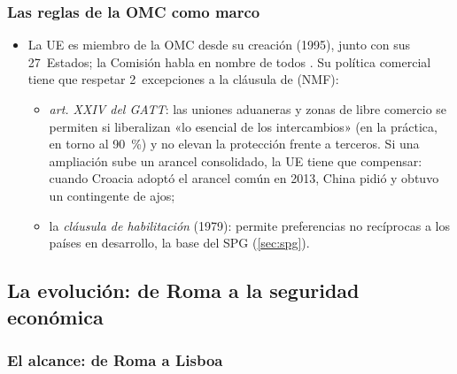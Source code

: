 \documentclass[11pt]{article}
\begin{document}
\subsubsection{Las reglas de la OMC como marco}\label{sec:omc-marco}

\begin{itemize}
\item La UE es miembro de la OMC desde su creación (1995), junto con sus 27~Estados; la Comisión habla en nombre de todos . Su política comercial tiene que respetar 2~excepciones a la cláusula de  (NMF):
  \begin{itemize}
  \item \emph{art. XXIV del GATT}: las uniones aduaneras y zonas de libre comercio se permiten si liberalizan «lo esencial de los intercambios» (en la práctica, en torno al 90~\%) y no elevan la protección frente a terceros. Si una ampliación sube un arancel consolidado, la UE tiene que compensar: cuando Croacia adoptó el arancel común en 2013, China pidió y obtuvo un contingente de ajos;
  \item la \emph{cláusula de habilitación} (1979): permite preferencias no recíprocas a los países en desarrollo, la base del SPG (\ref{sec:spg}).
  \end{itemize}
\end{itemize}

\subsection{La evolución: de Roma a la seguridad económica}\label{sec:estrategia}

\subsubsection{El alcance: de Roma a Lisboa}\label{sec:alcance}
\end{document}
